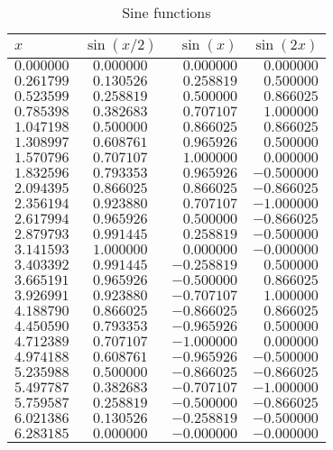 \begin{table}[!hbtp]
\centering
\caption{Sine functions}
\label{tab:sine}
\begin{tabular}{lcrr}
\toprule
        $x$ & $\sin(x/2)$ &   $\sin(x)$ &  $\sin(2x)$ \\
\midrule
$ 0.000000$ & $ 0.000000$ & $ 0.000000$ & $ 0.000000$ \\
$ 0.261799$ & $ 0.130526$ & $ 0.258819$ & $ 0.500000$ \\
$ 0.523599$ & $ 0.258819$ & $ 0.500000$ & $ 0.866025$ \\
$ 0.785398$ & $ 0.382683$ & $ 0.707107$ & $ 1.000000$ \\
$ 1.047198$ & $ 0.500000$ & $ 0.866025$ & $ 0.866025$ \\
$ 1.308997$ & $ 0.608761$ & $ 0.965926$ & $ 0.500000$ \\
$ 1.570796$ & $ 0.707107$ & $ 1.000000$ & $ 0.000000$ \\
$ 1.832596$ & $ 0.793353$ & $ 0.965926$ & $-0.500000$ \\
$ 2.094395$ & $ 0.866025$ & $ 0.866025$ & $-0.866025$ \\
$ 2.356194$ & $ 0.923880$ & $ 0.707107$ & $-1.000000$ \\
$ 2.617994$ & $ 0.965926$ & $ 0.500000$ & $-0.866025$ \\
$ 2.879793$ & $ 0.991445$ & $ 0.258819$ & $-0.500000$ \\
$ 3.141593$ & $ 1.000000$ & $ 0.000000$ & $-0.000000$ \\
$ 3.403392$ & $ 0.991445$ & $-0.258819$ & $ 0.500000$ \\
$ 3.665191$ & $ 0.965926$ & $-0.500000$ & $ 0.866025$ \\
$ 3.926991$ & $ 0.923880$ & $-0.707107$ & $ 1.000000$ \\
$ 4.188790$ & $ 0.866025$ & $-0.866025$ & $ 0.866025$ \\
$ 4.450590$ & $ 0.793353$ & $-0.965926$ & $ 0.500000$ \\
$ 4.712389$ & $ 0.707107$ & $-1.000000$ & $ 0.000000$ \\
$ 4.974188$ & $ 0.608761$ & $-0.965926$ & $-0.500000$ \\
$ 5.235988$ & $ 0.500000$ & $-0.866025$ & $-0.866025$ \\
$ 5.497787$ & $ 0.382683$ & $-0.707107$ & $-1.000000$ \\
$ 5.759587$ & $ 0.258819$ & $-0.500000$ & $-0.866025$ \\
$ 6.021386$ & $ 0.130526$ & $-0.258819$ & $-0.500000$ \\
$ 6.283185$ & $ 0.000000$ & $-0.000000$ & $-0.000000$ \\
\bottomrule
\end{tabular}
\end{table}
